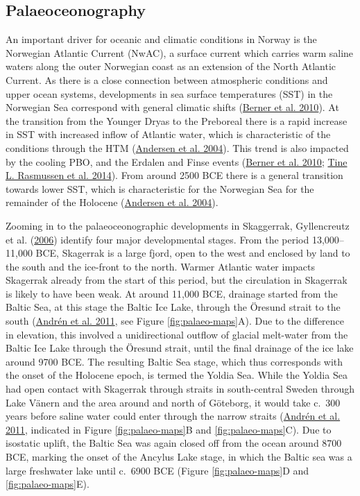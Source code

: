 \documentclass[
  12pt,
  a4paper,
  oneside]{book}
\begin{document}
\hypertarget{palaeoceonography}{%
\subsection{Palaeoceonography}\label{palaeoceonography}}

An important driver for oceanic and climatic conditions in Norway is the Norwegian Atlantic Current (NwAC), a surface current which carries warm saline waters along the outer Norwegian coast as an extension of the North Atlantic Current. As there is a close connection between atmospheric conditions and upper ocean systems, developments in sea surface temperatures (SST) in the Norwegian Sea correspond with general climatic shifts (\protect\hyperlink{ref-berner2010}{Berner et al. 2010}). At the transition from the Younger Dryas to the Preboreal there is a rapid increase in SST with increased inflow of Atlantic water, which is characteristic of the conditions through the HTM (\protect\hyperlink{ref-andersen2004}{Andersen et al. 2004}). This trend is also impacted by the cooling PBO, and the Erdalen and Finse events (\protect\hyperlink{ref-berner2010}{Berner et al. 2010}; \protect\hyperlink{ref-rasmussen2014b}{Tine L. Rasmussen et al. 2014}). From around 2500 BCE there is a general transition towards lower SST, which is characteristic for the Norwegian Sea for the remainder of the Holocene (\protect\hyperlink{ref-andersen2004}{Andersen et al. 2004}).

Zooming in to the palaeoceonographic developments in Skaggerrak, Gyllencreutz et al. (\protect\hyperlink{ref-gyllencreutz2006}{2006}) identify four major developmental stages. From the period 13,000--11,000 BCE, Skagerrak is a large fjord, open to the west and enclosed by land to the south and the ice-front to the north. Warmer Atlantic water impacts Skagerrak already from the start of this period, but the circulation in Skagerrak is likely to have been weak. At around 11,000 BCE, drainage started from the Baltic Sea, at this stage the Baltic Ice Lake, through the Öresund strait to the south (\protect\hyperlink{ref-andren2011}{Andrén et al. 2011}, see Figure \ref{fig:palaeo-maps}A). Due to the difference in elevation, this involved a unidirectional outflow of glacial melt-water from the Baltic Ice Lake through the Öresund strait, until the final drainage of the ice lake around 9700 BCE. The resulting Baltic Sea stage, which thus corresponds with the onset of the Holocene epoch, is termed the Yoldia Sea. While the Yoldia Sea had open contact with Skagerrak through straits in south-central Sweden through Lake Vänern and the area around and north of Göteborg, it would take c.~300 years before saline water could enter through the narrow straits (\protect\hyperlink{ref-andren2011}{Andrén et al. 2011}, indicated in Figure \ref{fig:palaeo-maps}B and \ref{fig:palaeo-maps}C). Due to isostatic uplift, the Baltic Sea was again closed off from the ocean around 8700 BCE, marking the onset of the Ancylus Lake stage, in which the Baltic sea was a large freshwater lake until c.~6900 BCE (Figure \ref{fig:palaeo-maps}D and \ref{fig:palaeo-maps}E).
\end{document}
